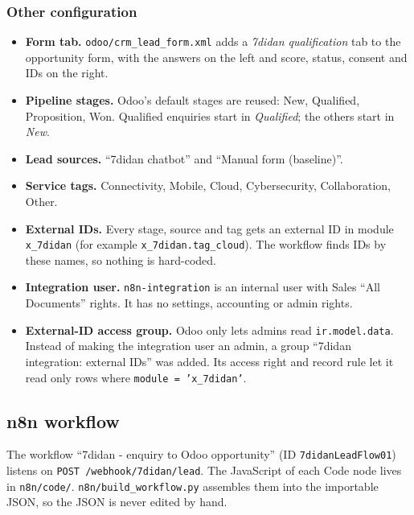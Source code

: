 \documentclass[11pt,a4paper]{article}
\newcommand{\f}[1]{\texttt{#1}}
\begin{document}
\subsubsection*{Other configuration}
\begin{itemize}
  \item \textbf{Form tab.} \f{odoo/crm\_lead\_form.xml} adds a \emph{7didan qualification} tab to the
        opportunity form, with the answers on the left and score, status, consent and IDs on the right.
  \item \textbf{Pipeline stages.} Odoo's default stages are reused: New, Qualified, Proposition, Won.
        Qualified enquiries start in \emph{Qualified}; the others start in \emph{New}.
  \item \textbf{Lead sources.} ``7didan chatbot'' and ``Manual form (baseline)''.
  \item \textbf{Service tags.} Connectivity, Mobile, Cloud, Cybersecurity, Collaboration, Other.
  \item \textbf{External IDs.} Every stage, source and tag gets an external ID in module \f{x\_7didan}
        (for example \f{x\_7didan.tag\_cloud}). The workflow finds IDs by these names, so nothing is hard-coded.
  \item \textbf{Integration user.} \f{n8n-integration} is an internal user with Sales ``All Documents''
        rights. It has no settings, accounting or admin rights.
  \item \textbf{External-ID access group.} Odoo only lets admins read \f{ir.model.data}. Instead of
        making the integration user an admin, a group ``7didan integration: external IDs'' was added. Its
        access right and record rule let it read only rows where \f{module = 'x\_7didan'}.
\end{itemize}

\subsection{n8n workflow}

The workflow ``7didan - enquiry to Odoo opportunity'' (ID \f{7didanLeadFlow01}) listens on
\f{POST /webhook/7didan/lead}. The JavaScript of each Code node lives in \f{n8n/code/}.
\f{n8n/build\_workflow.py} assembles them into the importable JSON, so the JSON is never edited by hand.
\end{document}
